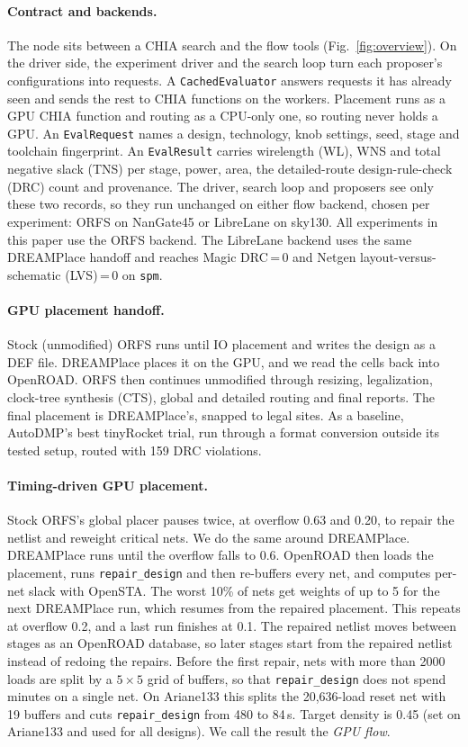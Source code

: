 \documentclass[sigconf]{acmart}
\begin{document}
\paragraph{Contract and backends.}
The node sits between a CHIA search and the flow tools
(Fig.~\ref{fig:overview}). On the driver side, the experiment driver and the
search loop turn each proposer's configurations into requests. A
\texttt{CachedEvaluator} answers requests it has already seen and sends the
rest to CHIA functions on the workers. Placement runs as a GPU CHIA function
and routing as a CPU-only one, so routing never holds a GPU. An
\texttt{EvalRequest} names a design, technology, knob settings, seed, stage and
toolchain fingerprint. An \texttt{EvalResult} carries wirelength (WL), WNS and total
negative slack (TNS) per stage, power, area, the detailed-route design-rule-check (DRC) count
and provenance. The driver, search loop and proposers see only these two
records, so they run unchanged on either flow backend, chosen per experiment:
ORFS on NanGate45 or LibreLane on sky130. All experiments in this paper use
the ORFS backend. The LibreLane backend uses the same DREAMPlace handoff and
reaches Magic DRC\,=\,0 and Netgen layout-versus-schematic (LVS)\,=\,0 on \texttt{spm}.

\paragraph{GPU placement handoff.}
Stock (unmodified) ORFS runs until IO placement and writes the design as a
DEF file. DREAMPlace places it on
the GPU, and we read the cells back into OpenROAD. ORFS then continues
unmodified through resizing, legalization, clock-tree synthesis (CTS), global
and detailed routing and final reports. The final placement is DREAMPlace's,
snapped to legal sites. As a baseline, AutoDMP's best tinyRocket trial, run
through a format conversion outside its tested setup, routed with 159 DRC
violations.

\paragraph{Timing-driven GPU placement.}
Stock ORFS's global placer pauses twice, at overflow 0.63 and 0.20, to repair
the netlist and reweight critical nets. We do the same
around DREAMPlace.
DREAMPlace runs until the overflow falls to 0.6. OpenROAD then loads the
placement, runs \texttt{repair\_design} and then re-buffers every net, and computes
per-net slack with OpenSTA. The worst 10\% of nets get weights of up to 5 for
the next DREAMPlace run, which resumes from the repaired placement. This
repeats at overflow 0.2, and a last run finishes at 0.1. The repaired netlist
moves between stages as an OpenROAD database, so later stages start from the
repaired netlist instead of redoing the repairs. Before
the first repair, nets with more than 2000 loads are split by a $5\times5$
grid of buffers, so that \texttt{repair\_design} does not spend minutes on a
single net. On Ariane133 this splits the 20,636-load reset net with 19
buffers and cuts \texttt{repair\_design} from 480 to 84\,s. Target density is
0.45 (set on Ariane133 and used for all designs). We call the result the
\emph{GPU flow}.
\end{document}
